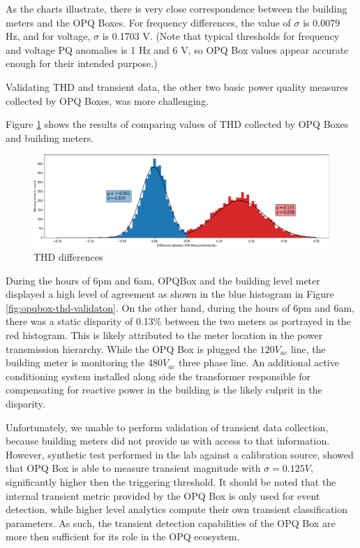 As the charts illustrate, there is very close correspondence between the building meters and the OPQ Boxes. For frequency differences, the value of $\sigma$ is 0.0079 Hz, and for voltage, $\sigma$ is 0.1703 V. (Note that typical thresholds for frequency and voltage PQ anomalies is 1 Hz and 6 V, so OPQ Box values appear accurate enough for their intended purpose.)

Validating THD and transient data, the other two basic power quality measures collected by OPQ Boxes, was more challenging.

Figure \ref{fig:opqbox-thd-validation} shows the results of comparing values of THD collected by OPQ Boxes and building meters.

\begin{figure}[ht]
  \centering
	\includegraphics[width=0.8\linewidth]{images/pilot/opqbox-thd-validation.png}
	\caption{THD differences}
	\label{fig:opqbox-thd-validation}
\end{figure}

During the hours of 6pm and 6am, OPQBox and the building level meter displayed a high level of agreement as shown in the blue histogram in Figure \ref{fig:opqbox-thd-validaton}.
On the other hand, during the hours of 6pm and 6am, there was a static disparity of 0.13\% between the two meters as portrayed  in the red histogram.
This is likely attributed to the meter location in the power transmission hierarchy.
While the OPQ Box is plugged the $120V_{ac}$ line, the building meter is monitoring the $480V_{ac}$ three phase line.
An additional active conditioning system installed along side the transformer responsible for compensating for reactive power in the building is the likely culprit in the disparity.

Unfortunately, we unable to perform validation of transient data collection, because building meters did not provide us with access to that information. 
However, synthetic test performed in the lab against a calibration source, showed that OPQ Box is able to measure transient magnitude with $\sigma=0.125V$, significantly higher then the triggering threshold.
It should be noted that the internal transient metric provided by the OPQ Box is only used for event detection, while higher level analytics compute their own transient classification parameters.
As such, the transient detection capabilities of the OPQ Box are more then sufficient for its role in the OPQ ecosystem.

